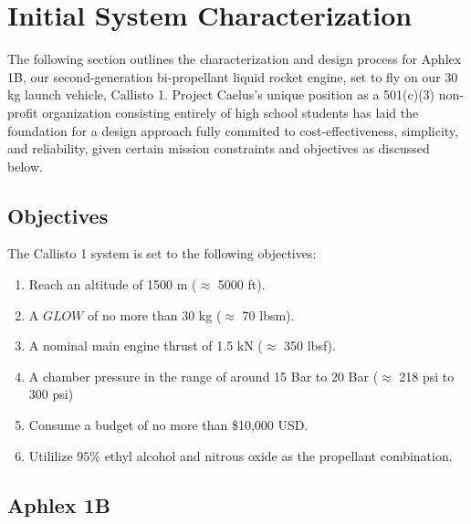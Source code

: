 \documentclass[9pt]{article} %
\numberwithin{equation}{section} %
\begin{document}
\section{Initial System Characterization}
\hspace{\parindent} The following section outlines the characterization and design process for Aphlex 1B, our second-generation bi-propellant liquid rocket engine, set to fly on our 30 kg launch vehicle, Callisto 1. Project Caelus's unique position as a 501(c)(3) non-profit organization consisting entirely of high school students has laid the foundation for a design approach fully commited to cost-effectiveness, simplicity, and reliability, given certain mission constraints and objectives as discussed below. 
\subsection{Objectives}
The Callisto 1 system is set to the following objectives:
\begin{enumerate}
\item Reach an altitude of 1500 m ($\approx$ 5000 ft).
\item A $GLOW$ of no more than 30 kg ($\approx$ 70 lbsm).
\item A nominal main engine thrust of 1.5 kN ($\approx$ 350 lbsf).
\item A chamber pressure in the range of around 15 Bar to 20 Bar ($\approx$ 218 psi to 300 psi)
\item Consume a budget of no more than \$10,000 USD.
\item Utililize $95\%$ ethyl alcohol and nitrous oxide as the propellant combination.
\end{enumerate}
\subsection{Aphlex 1B}
\end{document}
